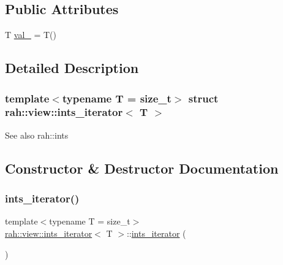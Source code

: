 \subsection*{Public Attributes}
\begin{DoxyCompactItemize}
\item 
T \mbox{\hyperlink{structrah_1_1view_1_1ints__iterator_a0136f64c4fdb5dd020ba213c1cc57f28}{val\+\_\+}} = T()
\end{DoxyCompactItemize}


\subsection{Detailed Description}
\subsubsection*{template$<$typename T = size\+\_\+t$>$\newline
struct rah\+::view\+::ints\+\_\+iterator$<$ T $>$}

\begin{DoxySeeAlso}{See also}
rah\+::ints 
\end{DoxySeeAlso}


\subsection{Constructor \& Destructor Documentation}
\mbox{\label{structrah_1_1view_1_1ints__iterator_a2b0f48ff5ad3b3754ea2818bfbefa9d5}} 
\subsubsection{\texorpdfstring{ints\_iterator()}{ints\_iterator()}\hspace{0.1cm}{\footnotesize\ttfamily [1/4]}}
{\footnotesize\ttfamily template$<$typename T  = size\+\_\+t$>$ \\
\mbox{\hyperlink{structrah_1_1view_1_1ints__iterator}{rah\+::view\+::ints\+\_\+iterator}}$<$ T $>$\+::\mbox{\hyperlink{structrah_1_1view_1_1ints__iterator}{ints\+\_\+iterator}} (\begin{DoxyParamCaption}{ }\end{DoxyParamCaption})\hspace{0.3cm}{\ttfamily [default]}}

